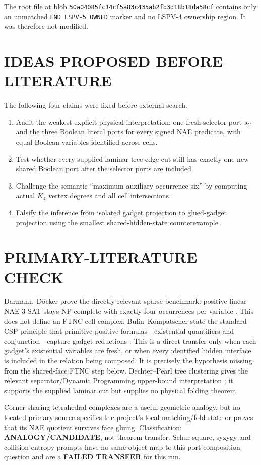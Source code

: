 \documentclass[11pt]{article}
\begin{document}
The root file at blob \texttt{50a04085fc14cf5a83c435ab2fb3d18b18da58cf}
contains only an unmatched \texttt{END LSPV-5 OWNED} marker and no LSPV-4
ownership region.  It was therefore not modified.

\section{IDEAS PROPOSED BEFORE LITERATURE}
The following four claims were fixed before external search.
\begin{enumerate}
\item Audit the weakest explicit physical interpretation: one fresh selector
port $s_C$ and the three Boolean literal ports for every signed NAE predicate,
with equal Boolean variables identified across cells.
\item Test whether every supplied laminar tree-edge cut still has exactly one
new shared Boolean port after the selector ports are included.
\item Challenge the semantic ``maximum auxiliary occurrence six'' by computing
actual $K_4$ vertex degrees and all cell intersections.
\item Falsify the inference from isolated gadget projection to glued-gadget
projection using the smallest shared-hidden-state counterexample.
\end{enumerate}

\section{PRIMARY-LITERATURE CHECK}
Darmann--D\"ocker prove the directly relevant sparse benchmark: positive
linear NAE-3-SAT stays NP-complete with exactly four occurrences per variable
\cite{DD}.  This does not define an FTNC cell complex.  Bul\'in--Kompatscher
state the standard CSP principle that primitive-positive formulas---existential
quantifiers and conjunction---capture gadget reductions \cite{BK}.  This is a
direct transfer only when each gadget's existential variables are fresh, or
when every identified hidden interface is included in the relation being
composed.  It is precisely the hypothesis missing from the shared-face FTNC
step below.  Dechter--Pearl tree clustering gives the relevant separator/Dynamic
Programming upper-bound interpretation \cite{DP}; it supports the supplied
laminar cut but supplies no physical folding theorem.

Corner-sharing tetrahedral complexes are a useful geometric analogy, but no
located primary source specifies the project's local matching/fold state or
proves that its NAE quotient survives face gluing.  Classification:
\textbf{ANALOGY/CANDIDATE}, not theorem transfer.  Schur-square, syzygy and
collision-entropy prompts have no same-object map to this port-composition
question and are a \textbf{FAILED TRANSFER} for this run.
\end{document}
